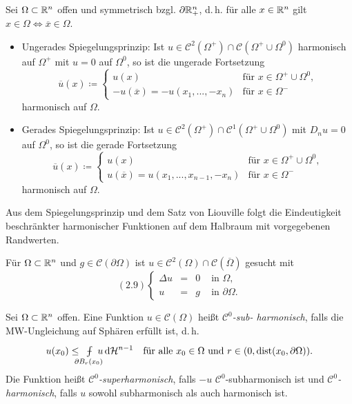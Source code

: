 \documentclass{cheat-sheet}
\newcommand{\HM}{\mathcal{H}} %
\DeclareMathOperator{\dist}{dist} %
\def\Xint#1{\mathchoice
   {\XXint\displaystyle\textstyle{#1}}%
   {\XXint\textstyle\scriptstyle{#1}}%
   {\XXint\scriptstyle\scriptscriptstyle{#1}}%
   {\XXint\scriptscriptstyle\scriptscriptstyle{#1}}%
   \!\int}
\def\XXint#1#2#3{{\setbox0=\hbox{$#1{#2#3}{\int}$}
     \vcenter{\hbox{$#2#3$}}\kern-.5\wd0}}
\def\dashint{\Xint-}
\newcommand{\mymvint}[2]{{\textstyle \dashint\limits_{#1}^{#2}}}
\newcommand{\MVInt}[4]{\mymvint{#1}{#2} #3 \,\d #4}
\begin{document}
\begin{satz}
  Sei $\Omega \subset \mathbb{R}^n$ offen und symmetrisch bzgl. $\partial \mathbb{R}^n_+$, d.\,h. für alle $x \in \mathbb{R}^n$ gilt $x \in \Omega \iff \overline{x} \in \Omega$.
  \begin{itemize}
    \item Ungerades Spiegelungsprinzip: Ist $u \in \mathcal{C}^2(\Omega^+) \cap \mathcal{C}(\Omega^+ \cup \Omega^0)$ harmonisch auf $\Omega^+$ mit $u = 0$ auf $\Omega^0$, so ist die ungerade Fortsetzung
    \[
      \overline{u}(x) \coloneqq \begin{cases}
        u(x) & \text{für $x \in \Omega^+ \cup \Omega^0$,}\\
        -u(\overline{x}) = -u(x_1, ..., -x_n) & \text{für $x \in \Omega^-$}
      \end{cases}
    \]
    harmonisch auf $\Omega$.
    \item Gerades Spiegelungsprinzip: Ist $u \in \mathcal{C}^2(\Omega^+) \cap \mathcal{C}^1(\Omega^+ \cup \Omega^0)$ mit $D_n u = 0$ auf $\Omega^0$, so ist die gerade Fortsetzung
    \[
      \overline{u}(x) \coloneqq \begin{cases}
        u(x) & \text{für $x \in \Omega^+ \cup \Omega^0$,}\\
        u(\overline{x}) = u(x_1, ..., x_{n-1}, -x_n) & \text{für $x \in \Omega^-$}
      \end{cases}
    \]
    harmonisch auf $\Omega$.
  \end{itemize}
\end{satz}

\begin{bem}
  Aus dem Spiegelungsprinzip und dem Satz von Liouville folgt die Eindeutigkeit beschränkter harmonischer Funktionen auf dem Halbraum mit vorgegebenen Randwerten.
\end{bem}


\begin{prob}
  Für $\Omega \subset \mathbb{R}^n$ und $g \in \mathcal{C}(\partial \Omega)$ ist $u \in \mathcal{C}^2(\Omega) \cap \mathcal{C}(\overline{\Omega})$ gesucht mit
  \[
    (2.9) \left\{ \begin{array}{rlll}
      \Delta u &=& 0 &\text{ in $\Omega$,}\\
      u &=& g &\text{ in $\partial \Omega$.}
    \end{array} \right.
  \]
\end{prob}

\begin{defn}
  Sei $\Omega \subset \mathbb{R}^n$ offen. Eine Funktion $u \in \mathcal{C}(\Omega)$ heißt \emph{$\mathcal{C}^0$-sub- harmonisch}, falls die MW-Ungleichung auf Sphären erfüllt ist, d.\,h.
  \[
    u(x_0) \leq \enspace \MVInt{\mathclap{\partial B_r(x_0)}}{}{\enspace u}{\HM^{n-1}} \quad
    \text{für alle $x_0 \in \Omega$ und $r \in \ointerval{0}{\dist(x_0, \partial \Omega)}$.}
  \]
  Die Funktion heißt \emph{$\mathcal{C}^0$-superharmonisch}, falls $-u$ $\mathcal{C}^0$-subharmonisch ist und \emph{$\mathcal{C}^0$-harmonisch}, falls $u$ sowohl subharmonisch als auch harmonisch ist.
\end{defn}
\end{document}
